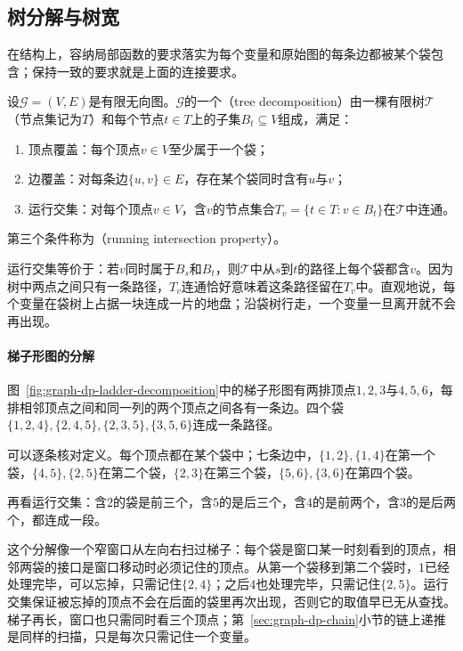 \subsection{树分解与树宽}
\label{sec:graph-tree-decomposition}
\label{sec:graph-dp-decomposition-definition}

在结构上，容纳局部函数的要求落实为每个变量和原始图的每条边都被某个袋包含；保持一致的要求就是上面的连接要求。

\begin{definition}[树分解]
\label{def:graph-dp-tree-decomposition}
设$\mathcal G=(V,E)$是有限无向图。$\mathcal G$的一个（tree decomposition）由一棵有限树$\mathcal T$（节点集记为$T$）和每个节点$t\in T$上的子集$B_t\subseteq V$组成，满足：
\begin{enumerate}
  \item 顶点覆盖：每个顶点$v\in V$至少属于一个袋；
  \item 边覆盖：对每条边$\{u,v\}\in E$，存在某个袋同时含有$u$与$v$；
  \item 运行交集：对每个顶点$v\in V$，含$v$的节点集合$T_v=\{t\in T:v\in B_t\}$在$\mathcal T$中连通。
\end{enumerate}
第三个条件称为（running intersection property）。
\end{definition}

运行交集等价于：若$v$同时属于$B_s$和$B_t$，则$\mathcal T$中从$s$到$t$的路径上每个袋都含$v$。因为树中两点之间只有一条路径，$T_v$连通恰好意味着这条路径留在$T_v$中。直观地说，每个变量在袋树上占据一块连成一片的地盘；沿袋树行走，一个变量一旦离开就不会再出现。

\paragraph{梯子形图的分解}
图~\ref{fig:graph-dp-ladder-decomposition}中的梯子形图有两排顶点$1,2,3$与$4,5,6$，每排相邻顶点之间和同一列的两个顶点之间各有一条边。四个袋$\{1,2,4\},\allowbreak\{2,4,5\},\allowbreak\{2,3,5\},\allowbreak\{3,5,6\}$连成一条路径。

可以逐条核对定义。每个顶点都在某个袋中；七条边中，$\{1,2\},\{1,4\}$在第一个袋，$\{4,5\},\{2,5\}$在第二个袋，$\{2,3\}$在第三个袋，$\{5,6\},\{3,6\}$在第四个袋。

再看运行交集：含$2$的袋是前三个，含$5$的是后三个，含$4$的是前两个，含$3$的是后两个，都连成一段。

这个分解像一个窄窗口从左向右扫过梯子：每个袋是窗口某一时刻看到的顶点，相邻两袋的接口是窗口移动时必须记住的顶点。从第一个袋移到第二个袋时，$1$已经处理完毕，可以忘掉，只需记住$\{2,4\}$；之后$4$也处理完毕，只需记住$\{2,5\}$。运行交集保证被忘掉的顶点不会在后面的袋里再次出现，否则它的取值早已无从查找。梯子再长，窗口也只需同时看三个顶点；第~\ref{sec:graph-dp-chain}小节的链上递推是同样的扫描，只是每次只需记住一个变量。

